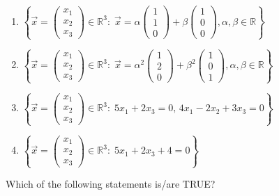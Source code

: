 \begin{enumerate}
\item $\left\{\vec{x} = \begin{pmatrix}x_1\\x_2\\x_3\end{pmatrix} \in \mathbb{R}^3:\;\vec{x} = \alpha \begin{pmatrix}1\\1\\0\end{pmatrix}+\beta\begin{pmatrix}1\\0\\0\end{pmatrix}, \alpha, \beta\in \mathbb{R}\right\}$
\item $\left\{\vec{x} = \begin{pmatrix}x_1\\x_2\\x_3\end{pmatrix} \in \mathbb{R}^3:\;\vec{x} = \alpha^2 \begin{pmatrix}1\\2\\0\end{pmatrix}+\beta^2\begin{pmatrix}1\\0\\1\end{pmatrix}, \alpha, \beta\in \mathbb{R}\right\}$
\item $\left\{\vec{x} = \begin{pmatrix}x_1\\x_2\\x_3\end{pmatrix} \in \mathbb{R}^3:\;5x_1 + 2x_3 = 0,\, 4x_1-2x_2+3x_3=0\right\}$
\item $\left\{\vec{x} = \begin{pmatrix}x_1\\x_2\\x_3\end{pmatrix} \in \mathbb{R}^3:\;5x_1 + 2x_3 + 4 = 0\right\}$
\end{enumerate}
\item Which of the following statements is/are TRUE?
